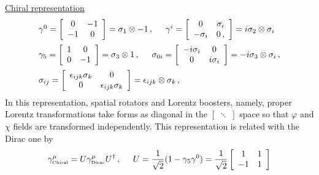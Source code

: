\noindent
\underline{Chiral representation}\\
\begin{eqnarray}
\begin{array}{l}
\gamma^0
=
\left[
\begin{array}{cc}
0 & -1 \\ -1 & 0
\end{array}
\right]
= \sigma_1 \otimes -1
\,,
\hspace{5mm}
\gamma^i
=
\left[
\begin{array}{cc}
0  & \sigma_i \\  -\sigma_i & 0\,,
\end{array}
\right]
=
i\sigma_2 \otimes \sigma_i
\vspace{2mm}
\\ %
\gamma_5
=
\left[
\begin{array}{cc}
1 & 0 \\ 0 & -1
\end{array}
\right]
= \sigma_3 \otimes 1
\,,
\hspace{5mm}
\sigma_{0i}
=
\left[
\begin{array}{cc}
-i\sigma_i & 0 \\  0 & i\sigma_i
\end{array}
\right]
=
-i\sigma_3 \otimes \sigma_i\,,
\vspace{2mm}
\\ %
\sigma_{ij}
=
\left[
\begin{array}{cc}
\epsilon_{ijk}\sigma_k & 0 \\  0 & \epsilon_{ijk}\sigma_k
\end{array}
\right]
=
\epsilon_{ijk} \otimes \sigma_k\,,
\end{array}
\end{eqnarray}
In this representation, spatial rotators and Lorentz boosters, namely, proper Lorentz transformations
take forms as diagonal in the $\left[\;\ddots\;\right]$ space so that $\varphi$ and $\chi$ fields
are transformed independently. This representation is related with the Dirac one by
\begin{eqnarray}
\gamma^\mu_{\mbox{\tiny Chiral}}
= U \gamma^\mu_{\mbox{\tiny Dirac}} U^{\dagger}\,,
\hspace{5mm}
U = 
\frac{1}{\sqrt{2}}
(1 - \gamma_5 \gamma^0)
=
\frac{1}{\sqrt{2}}
\left[
\begin{array}{cc}
1 & 1 \\
-1 & 1
\end{array}
\right]
\end{eqnarray}\\

